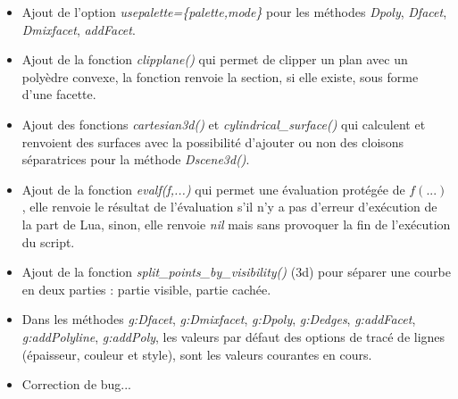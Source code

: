 \begin{itemize}
    \item Ajout de l'option \emph{usepalette=\{palette,mode\}} pour les méthodes \emph{Dpoly}, \emph{Dfacet}, \emph{Dmixfacet}, \emph{addFacet}.
    \item Ajout de la fonction \emph{clipplane()} qui permet de clipper un plan avec un polyèdre convexe, la fonction renvoie la section, si elle existe, sous forme d'une facette.
    \item Ajout des fonctions \emph{cartesian3d()} et \emph{cylindrical\_surface()} qui calculent et renvoient des surfaces avec la possibilité d'ajouter ou non des cloisons séparatrices pour la méthode \emph{Dscene3d()}.
    \item Ajout de la fonction \emph{evalf(f,...)} qui permet une évaluation protégée de $f(...)$, elle renvoie le résultat de l'évaluation s'il n'y a pas d'erreur d'exécution de la part de Lua, sinon, elle renvoie \emph{nil} mais sans provoquer la fin de l'exécution du script.
    \item Ajout de la fonction \emph{split\_points\_by\_visibility()} (3d) pour séparer une courbe en deux parties : partie visible, partie cachée.
    \item Dans les méthodes \emph{g:Dfacet}, \emph{g:Dmixfacet}, \emph{g:Dpoly}, \emph{g:Dedges}, \emph{g:addFacet}, \emph{g:addPolyline}, \emph{g:addPoly}, les valeurs par défaut des options de tracé de lignes (épaisseur, couleur et style), sont les valeurs courantes en cours.
    \item Correction de bug...    
\end{itemize}

